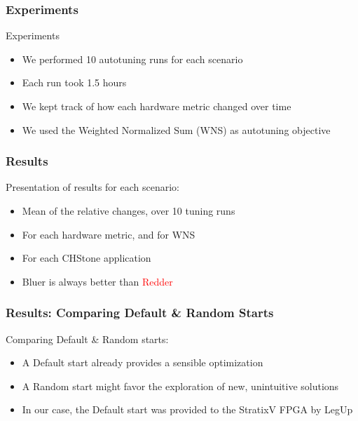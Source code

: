 \documentclass[10pt, compress, xcolor={table,xcdraw,usenames}, aspectratio=169]{beamer}
\begin{document}
\begin{frame}
    \frametitle{Experiments}
    \begin{block}{Experiments}
        \begin{itemize}
            \item We performed 10 \alert{autotuning runs for each scenario}
            \item Each run took \alert{1.5 hours}
            \item We kept track of \alert{how each hardware metric changed over
                time}
            \item We used the \alert{Weighted Normalized Sum} (\alert{WNS}) as
                \alert{autotuning objective}
        \end{itemize}
    \end{block}
\end{frame}

\begin{frame}
    \frametitle{Results}
    \begin{block}{Presentation of results for each scenario:}
        \begin{itemize}
            \item \alert{Mean of the relative changes}, over 10 tuning runs
            \item For each \alert{hardware metric}, and for \alert{WNS}
            \item For each \alert{CHStone application}
            \item \alert{Bluer} is always better than \textcolor{red}{Redder}
        \end{itemize}
    \end{block}
\end{frame}

\begin{frame}
    \frametitle{Results: Comparing Default \& Random Starts}
    \begin{block}{Comparing \alert{Default} \& \alert{Random} starts:}
        \begin{itemize}
            \item A \alert{Default} start already provides a \alert{sensible
                optimization}
            \item A \alert{Random} start might favor the \alert{exploration of
                new, unintuitive solutions}
            \item In our case, the \alert{Default} start was provided to the
                \alert{StratixV FPGA} by \alert{LegUp}
        \end{itemize}
    \end{block}
\end{frame}
\end{document}
